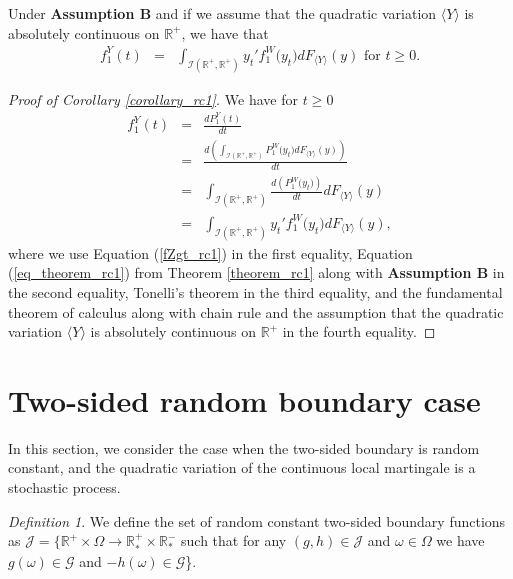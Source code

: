 \documentclass[aop]{imsart}
\theoremstyle{plain}
\theoremstyle{remark}
\newtheorem{definition}[theorem]{Definition}
\newcommand{\reels}{\mathbb{R}}
\begin{document}
\begin{corollary}
\label{corollary_rc1}
Under \textbf{Assumption B} and if we assume that the quadratic variation $\langle Y\rangle$ is absolutely continuous on $\reels^+$, we have that
\begin{eqnarray}
\label{eq_corollary_rc1}
f_1^Y (t) & = & \int_{\mathcal{I}(\reels^+,\reels^+)} y_t ' f_1^W \big(y_t\big) dF_{\langle Y\rangle}(y) \text{ for } t \geq 0.
\end{eqnarray}
\end{corollary}
\begin{proof}[Proof of Corollary \ref{corollary_rc1}]
We have for $t \geq 0$
\begin{eqnarray*}
f_1^Y (t) & = & \frac{dP_1^Y(t)}{dt}\\
& = & \frac{d(\int_{\mathcal{I}(\reels^+,\reels^+)} P_1^W \big(y_t\big) dF_{\langle Y\rangle}(y))}{dt}\\
& = & \int_{\mathcal{I}(\reels^+,\reels^+)} \frac{d(P_1^W \big(y_t\big))}{dt} dF_{\langle Y\rangle}(y)\\
& = & \int_{\mathcal{I}(\reels^+,\reels^+)} y_t ' f_1^W \big(y_t\big) dF_{\langle Y\rangle}(y),
\end{eqnarray*}
where we use Equation (\ref{fZgt_rc1}) in the first equality, Equation (\ref{eq_theorem_rc1}) from Theorem \ref{theorem_rc1} along with \textbf{Assumption B} in the second equality, Tonelli's theorem in the third equality, and the fundamental theorem of calculus along with chain rule and the assumption that the quadratic variation $\langle Y\rangle$ is absolutely continuous on $\reels^+$ in the fourth equality.
\end{proof}


\section{Two-sided random boundary case}
In this section, we consider the case when the two-sided boundary is random constant, and the quadratic variation of the continuous local martingale is a stochastic process.
\begin{definition}\label{defboundaryset_rc2}
We define the set of random constant two-sided boundary functions as $\mathcal{J} = \big\{ \reels^+ \times \Omega \rightarrow \reels_*^+ \times \reels_*^-$ such that for any $(g,h) \in \mathcal{J}$ and $\omega \in \Omega$ we have $g(\omega) \in \mathcal{G}$ and $-h(\omega) \in \mathcal{G}$\big\}.
\end{definition}
 
\end{document}
